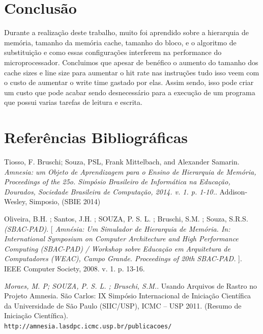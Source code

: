 \documentclass[conference]{IEEEtran}
\begin{document}
\section{Conclusão}

Durante a realização deste trabalho, muito foi aprendido sobre a hierarquia de memória, tamanho da memória cache, tamanho do bloco, e o algoritmo de substituição e como essas configurações interferem na performance do microprocessador. Concluimos que apesar de benéfico o  aumento do tamanho dos cache sizes e line size para aumentar o hit rate nas instruções tudo isso veem com o custo de aumentar o write time gastado por elas. Assim sendo, isso pode criar um custo que pode acabar sendo desnecessário para a execução de um programa que possui varias tarefas de leitura e escrita.

\section{Referências Bibliográficas}

\begin{thebibliography}{9}
Tiosso, F. Bruschi; Souza, PSL, Frank Mittelbach, and Alexander Samarin. 
\textit{Amnesia: um Objeto de Aprendizagem para o Ensino de Hierarquia de Memória, Proceedings of the 25o. Simpósio Brasileiro de Informática na Educação, Dourados, Sociedade Brasileira de Computação, 2014. v. 1. p. 1-10.}. 
Addison-Wesley, Simposio,  (SBIE 2014)

Oliveira, B.H. ; Santos, J.H. ; SOUZA, P. S. L. ; Bruschi, S.M. ; Souza, S.R.S.
\textit{(SBAC-PAD)}. 
[\textit{ Amnésia: Um Simulador de Hierarquia de Memória. In: International Symposium on Computer Architecture and High Performance Computing (SBAC-PAD) / Workshop sobre Educação em Arquitetura de Computadores (WEAC), Campo Grande. Proceedings of 20th SBAC-PAD. }]. 
IEEE Computer Society, 2008. v. 1. p. 13-16.

\textit{Moraes, M. P; SOUZA, P. S. L. ; Bruschi, S.M.}.
Usando Arquivos de Rastro no Projeto Amnesia. São Carlos: IX Simpósio Internacional de Iniciação Científica da Universidade de São Paulo (SIIC/USP), ICMC – USP 2011. (Resumo de Iniciação Científica).
\\\texttt{http://amnesia.lasdpc.icmc.usp.br/publicacoes/}
\end{thebibliography}
\end{document}
